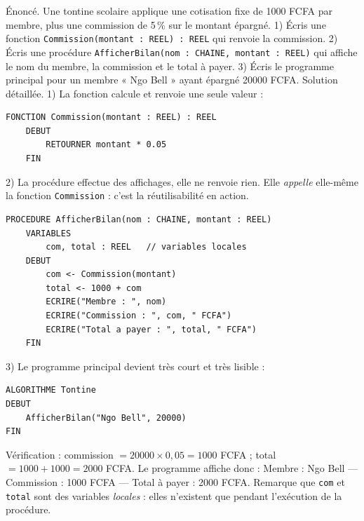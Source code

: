 \documentclass[11pt]{article}
\begin{document}
\begin{exoresolu}
Énoncé. Une tontine scolaire applique une cotisation fixe de \num{1000} FCFA par membre, plus une commission de 5\,\% sur le montant épargné. 1) Écris une fonction \texttt{Commission(montant : REEL) : REEL} qui renvoie la commission. 2) Écris une procédure \texttt{AfficherBilan(nom : CHAINE, montant : REEL)} qui affiche le nom du membre, la commission et le total à payer. 3) Écris le programme principal pour un membre « Ngo Bell » ayant épargné \num{20000} FCFA.
\tcblower
Solution détaillée. 1) La fonction calcule et renvoie une seule valeur :
\begin{lstlisting}
FONCTION Commission(montant : REEL) : REEL
    DEBUT
        RETOURNER montant * 0.05
    FIN
\end{lstlisting}
2) La procédure effectue des affichages, elle ne renvoie rien. Elle \emph{appelle} elle-même la fonction \texttt{Commission} : c'est la réutilisabilité en action.
\begin{lstlisting}
PROCEDURE AfficherBilan(nom : CHAINE, montant : REEL)
    VARIABLES
        com, total : REEL   // variables locales
    DEBUT
        com <- Commission(montant)
        total <- 1000 + com
        ECRIRE("Membre : ", nom)
        ECRIRE("Commission : ", com, " FCFA")
        ECRIRE("Total a payer : ", total, " FCFA")
    FIN
\end{lstlisting}
3) Le programme principal devient très court et très lisible :
\begin{lstlisting}
ALGORITHME Tontine
DEBUT
    AfficherBilan("Ngo Bell", 20000)
FIN
\end{lstlisting}
Vérification : commission $= 20000 \times 0{,}05 = 1000$ FCFA ; total $= 1000 + 1000 = 2000$ FCFA. Le programme affiche donc : Membre : Ngo Bell — Commission : 1000 FCFA — Total à payer : 2000 FCFA. Remarque que \texttt{com} et \texttt{total} sont des variables \emph{locales} : elles n'existent que pendant l'exécution de la procédure.
\end{exoresolu}
\end{document}
